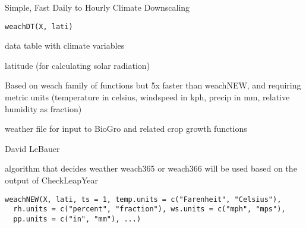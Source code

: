 \documentclass[letterpaper]{book}
\begin{document}
%
\begin{Description}\relax
Simple, Fast Daily to Hourly Climate Downscaling
\end{Description}
%
\begin{Usage}
\begin{verbatim}
weachDT(X, lati)
\end{verbatim}
\end{Usage}
%
\begin{Arguments}
\begin{ldescription}
\item[\code{X}] data table with climate variables

\item[\code{lati}] latitude (for calculating solar radiation)
\end{ldescription}
\end{Arguments}
%
\begin{Details}\relax
Based on weach family of functions but 5x faster than
weachNEW, and requiring metric units (temperature in
celsius, windspeed in kph, precip in mm, relative humidity
as fraction)
\end{Details}
%
\begin{Value}
weather file for input to BioGro and related crop growth
functions
\end{Value}
%
\begin{Author}\relax
David LeBauer
\end{Author}
%
\begin{Description}\relax
algorithm that decides weather weach365 or weach366 will be
used based on the output of CheckLeapYear
\end{Description}
%
\begin{Usage}
\begin{verbatim}
weachNEW(X, lati, ts = 1, temp.units = c("Farenheit", "Celsius"),
  rh.units = c("percent", "fraction"), ws.units = c("mph", "mps"),
  pp.units = c("in", "mm"), ...)
\end{verbatim}
\end{Usage}
%
\end{document}
